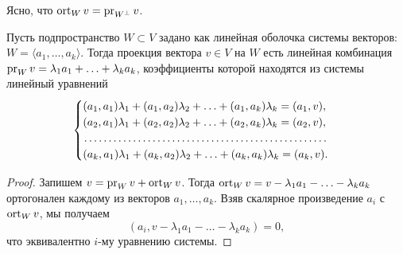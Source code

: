 Ясно, что $\operatorname{ort}_Wv = \operatorname{pr}_{W^\perp}v$.

\begin{proposal}
    Пусть подпространство $W \subset V$ задано как линейная оболочка системы векторов: $W = \langle a_1, \ldots, a_k\rangle$. Тогда проекция вектора $v \in V$ на $W$ есть линейная комбинация $\operatorname{pr}_Wv = \lambda_1a_1 + \ldots + \lambda_ka_k$, коэффициенты которой находятся из системы линейный уравнений
    \[
        \begin{cases}
            (a_1, a_1)\lambda_1 + (a_1, a_2)\lambda_2 + \ldots + (a_1, a_k)\lambda_k = (a_1, v),\\
            (a_2, a_1)\lambda_1 + (a_2, a_2)\lambda_2 + \ldots + (a_2, a_k)\lambda_k = (a_2, v),\\
            \dotfill\\
            (a_k, a_1)\lambda_1 + (a_k, a_2)\lambda_2 + \ldots + (a_k, a_k)\lambda_k = (a_k, v).
        \end{cases}
    \]
\end{proposal}

\begin{proof}
    Запишем $v = \operatorname{pr}_Wv + \operatorname{ort}_Wv$. Тогда $\operatorname{ort}_Wv = v - \lambda_1a_1 - \ldots - \lambda_ka_k$ ортогонален каждому из векторов $a_1, \ldots, a_k$. Взяв скалярное произведение $a_i$ с $\operatorname{ort}_Wv$, мы получаем
    \[
        (a_i, v - \lambda_1a_1 - \ldots - \lambda_ka_k) = 0,
    \]
    что эквивалентно $i$-му уравнению системы.
\end{proof}

